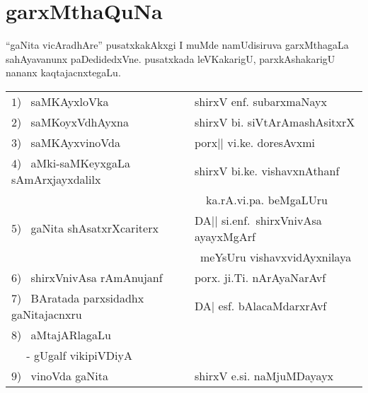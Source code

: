 \chapter{garxMthaQuNa}

``gaNita vicAradhAre''  pusatxkakAkxgi I muMde namUdisiruva garxMthagaLa sahAyavanunx paDedidedxVne. pusatxkada leVKakarigU, parxkAshakarigU nananx kaqtajacnxtegaLu.

\bigskip
\noindent
\begin{tabular}{ll}
$1$)~ saMKAyxloVka & shirxV enf. subarxmaNayx\\[0.2cm]
$2$)~ saMKoyxVdhAyxna & shirxV bi. siVtArAmashAsitxrX\\[0.2cm]
$3$)~ saMKAyxvinoVda & porx|| vi.ke. doresAvxmi\\[0.2cm]
  $4$)~ aMki-saMKeyxgaLa sAmArxjayxdalilx & shirxV bi.ke. vishavxnAthanf\\
  & ~~ka.rA.vi.pa. beMgaLUru\\[0.2cm]
  $5$)~ gaNita shAsatxrXcariterx & DA|| si.enf.~shirxVnivAsa ayayxMgArf \\
  & ~meYsUru vishavxvidAyxnilaya\\[0.2cm]
$6$)~ shirxVnivAsa rAmAnujanf &  porx. ji.Ti. nArAyaNarAvf\\[0.2cm]
$7$)~ BAratada parxsidadhx gaNitajacnxru & DA| esf. bAlacaMdarxrAvf\\[0.2cm]
  $8$)~ aMtajARlagaLu &\\
~~   - gUgalf vikipiVDiyA & \\[0.2cm]
$9$)~ vinoVda gaNita & shirxV e.si. naMjuMDayayx
\end{tabular}
  
